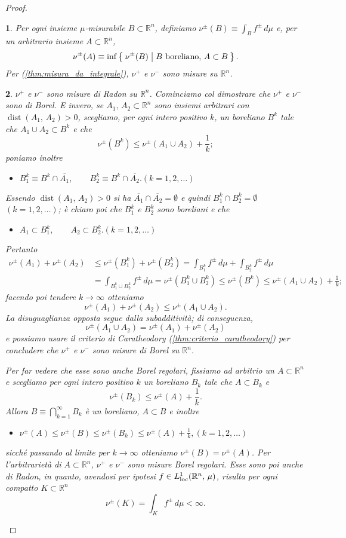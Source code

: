 \documentclass[a4paper,10pt,openright,oneside]{book}
\theoremstyle{theoremstyle}
\theoremstyle{theoremstylewoheader}
\theoremstyle{theoremstyle}
\theoremstyle{proofsecstyle}
\newtheorem{proofsec}{}
\theoremstyle{nonumberplain}
\newtheorem{proof}{Dim.}
\newcommand{\RR}{\ensuremath{\mathbb{R}}}
\newcommand{\closure}[1]{\ensuremath{\overline{#1}}}
\DeclareMathOperator{\dist}{dist}
\newcommand{\mymath}[2]{\begin{itemize}%
  \item[]\hfill\hbox{}\ensuremath{\displaystyle #1}\hfill\ensuremath{\displaystyle #2}%
  \end{itemize}}
\begin{document}
\begin{proof}
\begin{proofsec}
Per ogni insieme $\mu$-misurabile $B \subset \RR^n$, definiamo $\nu^\pm (B) \equiv \int_B f^\pm\, d\mu$ e, per un arbitrario insieme $A \subset \RR^n$,
\[
\nu^\pm (A) \equiv \inf\Set{ \nu^\pm(B) | \text{$B$ boreliano, $A \subset B$} }.
\]
Per (\ref{thm:misura_da_integrale}), $\nu^+$ e $\nu^-$ sono misure su $\RR^n$.
\end{proofsec}

\begin{proofsec}
\emph{$\nu^+$ e $\nu^-$ sono misure di Radon su $\RR^n$.}\hspace{.5em} Cominciamo col dimostrare che $\nu^+$ e $\nu^-$ sono di Borel. E invero, se $A_1,\, A_2 \subset \RR^n$ sono insiemi arbitrari con $\dist(A_1,\, A_2) > 0$, scegliamo, per ogni intero positivo $k$, un boreliano $B^k$ tale che $A_1 \cup A_2 \subset B^k$ e che
\[
\nu^\pm(B^k) \le \nu^\pm(A_1 \cup A_2) + \frac{1}{k};
\]
poniamo inoltre \mymath{B^k_1 \equiv B^k \cap \closure{A_1},\qquad B^k_2 \equiv B^k \cap \closure{A_2}.}{(k = 1, 2, \ldots)} Essendo $\dist(A_1,\, A_2) > 0$ si ha $\closure{A_1} \cap \closure{A_2} = \emptyset$ e quindi $B^k_1 \cap B^k_2 = \emptyset$ $(k = 1, 2, \ldots)$; è chiaro poi che $B^k_1$ e $B^k_2$ sono boreliani e che \mymath{A_1 \subset B^k_1,\qquad A_2 \subset B^k_2.}{(k = 1, 2, \ldots)} Pertanto
\begin{align*}
\nu^\pm(A_1) + \nu^\pm(A_2) &\le \nu^\pm(B^k_1) + \nu^\pm(B^k_2) = \int_{B^k_1} f^\pm\, d\mu + \int_{B^k_2} f^\pm\, d\mu\\
&= \int_{B^k_1 \cup B^k_2} f^\pm\, d\mu = \nu^\pm(B^k_1 \cup B^k_2) \le \nu^\pm(B^k) \le \nu^\pm(A_1 \cup A_2) + \frac{1}{k};
\end{align*}
facendo poi tendere $k \to \infty$ otteniamo
\[
\nu^\pm(A_1) + \nu^\pm(A_2) \le \nu^\pm(A_1 \cup A_2).
\] 
La disuguaglianza opposta segue dalla subadditività; di conseguenza,
\[
\nu^\pm(A_1 \cup A_2) = \nu^\pm(A_1) + \nu^\pm(A_2)
\] 
e possiamo usare il criterio di Caratheodory (\ref{thm:criterio_caratheodory}) per concludere che $\nu^+$ e $\nu^-$ sono misure di Borel su $\RR^n$.

Per far vedere che esse sono anche Borel regolari, fissiamo ad arbitrio un $A \subset \RR^n$ e scegliamo per ogni intero positivo $k$ un boreliano $B_k$ tale che $A \subset B_k$ e
\[
\nu^\pm(B_k) \le \nu^\pm(A) + \frac{1}{k}.
\]
Allora $B \equiv \bigcap_{k=1}^\infty B_k$ è un boreliano, $A \subset B$ e inoltre \mymath{\nu^\pm(A) \le \nu^\pm(B) \le \nu^\pm(B_k) \le \nu^\pm(A) + \frac{1}{k},}{(k = 1, 2, \ldots)} sicché passando al limite per $k \to \infty$ otteniamo $\nu^\pm(B) = \nu^\pm(A)$. Per l'arbitrarietà di $A \subset \RR^n$, $\nu^+$ e $\nu^-$ sono misure Borel regolari. Esse sono poi anche di Radon, in quanto, avendosi per ipotesi $f \in L_\textup{loc}^1(\RR^n,\, \mu)$, risulta per ogni compatto $K \subset \RR^n$
\[
\nu^\pm(K) = \int_K f^\pm\, d\mu < \infty.
\]
\end{proofsec}


\end{proof}
\end{document}
